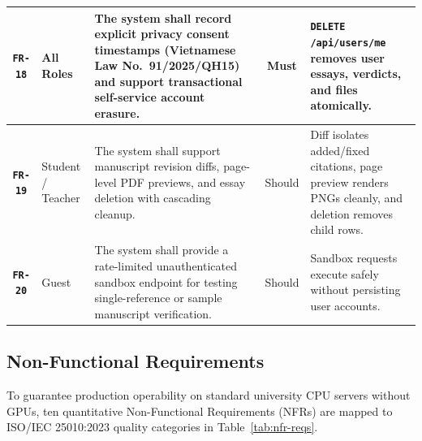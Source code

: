 {\begin{longtable}{|C{0.10}|L{0.16}|L{0.38}|C{0.11}|L{0.25}|}
\hline
\textbf{\texttt{FR-18}} & All Roles & The system shall record explicit privacy consent timestamps (Vietnamese Law No.\ 91/2025/QH15) and support transactional self-service account erasure. & \textbf{Must} & \texttt{DELETE /api/users/me} removes user essays, verdicts, and files atomically. \\
\hline
\textbf{\texttt{FR-19}} & Student / Teacher & The system shall support manuscript revision diffs, page-level PDF previews, and essay deletion with cascading cleanup. & Should & Diff isolates added/fixed citations, page preview renders PNGs cleanly, and deletion removes child rows. \\
\hline
\textbf{\texttt{FR-20}} & Guest & The system shall provide a rate-limited unauthenticated sandbox endpoint for testing single-reference or sample manuscript verification. & Should & Sandbox requests execute safely without persisting user accounts. \\
\hline
\end{longtable}
}

\subsection{Non-Functional Requirements}

To guarantee production operability on standard university CPU servers without GPUs, ten quantitative Non-Functional Requirements (NFRs) are mapped to ISO/IEC 25010:2023 quality categories in Table~\ref{tab:nfr-reqs}.

